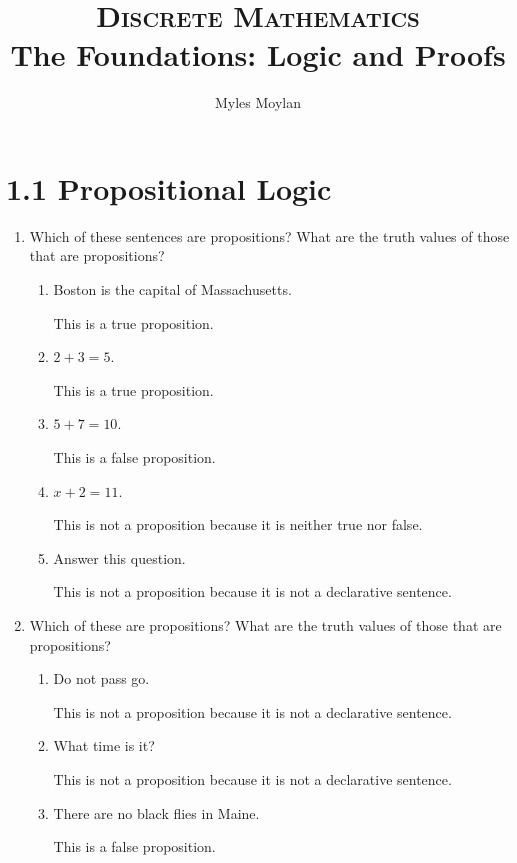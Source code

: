 \documentclass[11pt]{article}
\title{	
	\normalfont \normalsize 
	\textsc{Discrete Mathematics} \\
	\huge The Foundations: Logic and Proofs \\
}
\author{Myles Moylan} %
\date{} %
\begin{document}
\maketitle

\section*{\textbf{1.1 Propositional Logic}}
\begin{enumerate}[label=\textbf{\arabic*.}]
	\item Which of these sentences are propositions? What are the truth values of those that are propositions?
	\begin{enumerate}[label=\textbf{\alph*)}]
		\item Boston is the capital of Massachusetts.
		
		This is a true proposition.
		
		\item $2 + 3 = 5$.
		
		This is a true proposition.
		
		\item $5 + 7 = 10$.
		
		This is a false proposition.
		
		\item $x + 2 = 11$.
		
		This is not a proposition because it is neither true nor false.
		
		\item Answer this question.
		
		This is not a proposition because it is not a declarative sentence.
	\end{enumerate}

	\item Which of these are propositions? What are the truth values of those that are propositions?
	\begin{enumerate}[label=\textbf{\alph*)}]
		\item Do not pass go.
		
		This is not a proposition because it is not a declarative sentence.
		
		\item What time is it?
		
		This is not a proposition because it is not a declarative sentence.
		
		\item There are no black flies in Maine.
		
		This is a false proposition.
		

\end{enumerate}
\end{enumerate}
\end{document}
